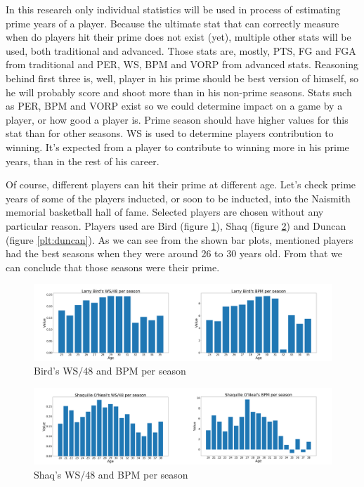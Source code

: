 \documentclass[a4paper]{article}
\begin{document}
In this research only individual statistics will be used in process of estimating prime years of a player. Because the ultimate stat that can correctly measure when do players hit their prime does not exist (yet), multiple other stats will be used, both traditional and advanced. Those stats are, mostly, PTS, FG and FGA from traditional and PER, WS, BPM and VORP from advanced stats. Reasoning behind first three is, well, player in his prime should be best version of himself, so he will probably score and shoot more than in his non-prime seasons. Stats such as PER, BPM and VORP exist so we could determine impact on a game by a player, or how good a player is. Prime season should have higher values for this stat than for other seasons. WS is used to determine players contribution to winning. It's expected from a player to contribute to winning more in his prime years, than in the rest of his career.

Of course, different players can hit their prime at different age. Let's check prime years of some of the players inducted, or soon to be inducted, into the Naismith memorial basketball hall of fame. Selected players are chosen without any particular reason. Players used are Bird (figure \ref{plt:bird}), Shaq (figure \ref{plt:shaq}) and Duncan (figure \ref{plt:duncan}). As we can see from the shown bar plots, mentioned players had the best seasons when they were around 26 to 30 years old. From that we can conclude that those seasons were their prime.


\begin{figure}[h!]
\begin{center}
\includegraphics[scale=0.30]{bird.png}
\end{center}
\caption{Bird's WS/48 and BPM per season}
\label{plt:bird}
\end{figure}

\begin{figure}[h!]
\begin{center}
\includegraphics[scale=0.30]{shaq.png} %
\end{center}
\caption{Shaq's WS/48 and BPM per season}
\label{plt:shaq}
\end{figure}
\end{document}
